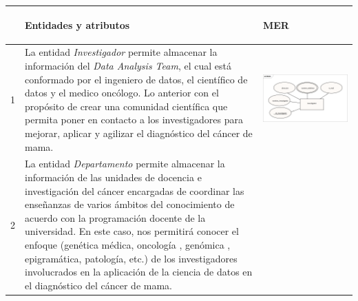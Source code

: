 \begin{table}[htb!]
	\footnotesize
	\begin{threeparttable}
		\begin{tabular}{p{0.5cm} p{7cm} p{7cm}} \toprule 
			&\begin{center}Entidades y atributos\end{center}             
			&\begin{center}MER\end{center}\\ \hline
			1
			& La entidad \textit{Investigador} permite almacenar la información del \textit{Data Analysis Team}, el cual está conformado por el ingeniero de datos, el científico de datos y el medico oncólogo. Lo anterior con el propósito de crear una comunidad científica que permita poner en contacto a los investigadores para mejorar, aplicar y agilizar el diagnóstico del cáncer de mama. 
			& \begin{center}\includegraphics[width=1\linewidth]{MER/IMAGENES_MER/1_INVESTIGADOR}\end{center}
			\\ \hline
			2
			& La entidad \textit{Departamento} permite almacenar la información de las unidades de docencia e investigación del cáncer encargadas de coordinar las enseñanzas de varios ámbitos del conocimiento de acuerdo con la programación docente de la universidad. En este caso, nos permitirá conocer el enfoque (genética médica, oncología , genómica , epigramática, patología, etc.) de los investigadores involucrados en la aplicación de la ciencia de datos en el diagnóstico del cáncer de mama.

\end{tabular}
\end{threeparttable}
\end{table}

